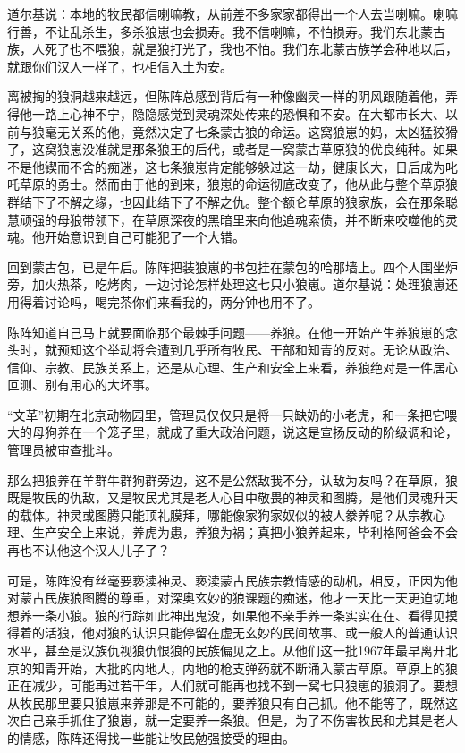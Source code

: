 \par 道尔基说：本地的牧民都信喇嘛教，从前差不多家家都得出一个人去当喇嘛。喇嘛行善，不让乱杀生，多杀狼崽也会损寿。我不信喇嘛，不怕损寿。我们东北蒙古族，人死了也不喂狼，就是狼打光了，我也不怕。我们东北蒙古族学会种地以后，就跟你们汉人一样了，也相信入土为安。
\par 离被掏的狼洞越来越远，但陈阵总感到背后有一种像幽灵一样的阴风跟随着他，弄得他一路上心神不宁，隐隐感觉到灵魂深处传来的恐惧和不安。在大都市长大、以前与狼毫无关系的他，竟然决定了七条蒙古狼的命运。这窝狼崽的妈，太凶猛狡猾了，这窝狼崽没准就是那条狼王的后代，或者是一窝蒙古草原狼的优良纯种。如果不是他锲而不舍的痴迷，这七条狼崽肯定能够躲过这一劫，健康长大，日后成为叱吒草原的勇士。然而由于他的到来，狼崽的命运彻底改变了，他从此与整个草原狼群结下了不解之缘，也因此结下了不解之仇。整个额仑草原的狼家族，会在那条聪慧顽强的母狼带领下，在草原深夜的黑暗里来向他追魂索债，并不断来咬噬他的灵魂。他开始意识到自己可能犯了一个大错。
\par 
\par 回到蒙古包，已是午后。陈阵把装狼崽的书包挂在蒙包的哈那墙上。四个人围坐炉旁，加火热茶，吃烤肉，一边讨论怎样处理这七只小狼崽。道尔基说：处理狼崽还用得着讨论吗，喝完茶你们来看我的，两分钟也用不了。
\par 陈阵知道自己马上就要面临那个最棘手问题——养狼。在他一开始产生养狼崽的念头时，就预知这个举动将会遭到几乎所有牧民、干部和知青的反对。无论从政治、信仰、宗教、民族关系上，还是从心理、生产和安全上来看，养狼绝对是一件居心叵测、别有用心的大坏事。
\par “文革”初期在北京动物园里，管理员仅仅只是将一只缺奶的小老虎，和一条把它喂大的母狗养在一个笼子里，就成了重大政治问题，说这是宣扬反动的阶级调和论，管理员被审查批斗。
\par 那么把狼养在羊群牛群狗群旁边，这不是公然敌我不分，认敌为友吗？在草原，狼既是牧民的仇敌，又是牧民尤其是老人心目中敬畏的神灵和图腾，是他们灵魂升天的载体。神灵或图腾只能顶礼膜拜，哪能像家狗家奴似的被人豢养呢？从宗教心理、生产安全上来说，养虎为患，养狼为祸；真把小狼养起来，毕利格阿爸会不会再也不认他这个汉人儿子了？
\par 可是，陈阵没有丝毫要亵渎神灵、亵渎蒙古民族宗教情感的动机，相反，正因为他对蒙古民族狼图腾的尊重，对深奥玄妙的狼课题的痴迷，他才一天比一天更迫切地想养一条小狼。狼的行踪如此神出鬼没，如果他不亲手养一条实实在在、看得见摸得着的活狼，他对狼的认识只能停留在虚无玄妙的民间故事、或一般人的普通认识水平，甚至是汉族仇视狼仇恨狼的民族偏见之上。从他们这一批1967年最早离开北京的知青开始，大批的内地人，内地的枪支弹药就不断涌入蒙古草原。草原上的狼正在减少，可能再过若干年，人们就可能再也找不到一窝七只狼崽的狼洞了。要想从牧民那里要只狼崽来养那是不可能的，要养狼只有自己抓。他不能等了，既然这次自己亲手抓住了狼崽，就一定要养一条狼。但是，为了不伤害牧民和尤其是老人的情感，陈阵还得找一些能让牧民勉强接受的理由。
